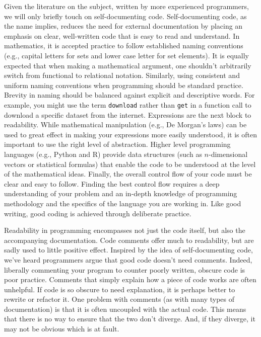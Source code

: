 \documentclass[ChapterTOCs,krantz2]{krantz} %
\theoremstyle{definition}
\begin{document}
Given the literature on the subject, written by more experienced programmers,
we will only briefly touch on self-documenting code. Self-documenting code, as
the name implies, reduces the need for external documentation by placing an
emphasis on clear, well-written code that is easy to read and understand.  In
mathematics, it is accepted practice to follow established naming conventions
(e.g., capital letters for sets and lower case letter for set elements). It is
equally expected that when making a mathematical argument, one shouldn't
arbitrarily switch from functional to relational notation.  Similarly, using
consistent and uniform naming conventions when programming should be standard
practice. Brevity in naming should be balanced against explicit and descriptive
words. For example, you might use the term \texttt{download} rather than
\texttt{get} in a function call to download a specific dataset from the
internet. Expressions are the next block to readability. While mathematical
manipulation (e.g., De Morgan's laws) can be used to great effect in making
your expressions more easily understood, it is often important to use the right
level of abstraction. Higher level programming languages (e.g., Python
and R) provide data structures (such as $n$-dimensional vectors or statistical
formulas) that enable the code to be understood at the level of the
mathematical ideas. Finally, the overall control flow of your code must be
clear and easy to follow. Finding the best control flow requires a deep
understanding of your problem and an in-depth knowledge of programming
methodology and the specifics of the language you are working in. Like good
writing, good coding is achieved through deliberate practice.

Readability in programming encompasses not just the code itself,
but also the accompanying documentation. Code comments offer much to readability,
but are sadly used to little positive effect. Inspired by the idea of
self-documenting code, we've heard programmers argue that good code doesn't
need comments. Indeed, liberally commenting your program to counter poorly
written, obscure code is poor practice. Comments that simply explain how a piece
of code works are often unhelpful. If code is so obscure to need explanation,
it is perhaps better to rewrite or refactor it. One problem with comments (as
with many types of documentation) is that it is often uncoupled with the actual
code. This means that there is no way to ensure that the two don't diverge.
And, if they diverge, it may not be obvious which is at fault.
\end{document}
